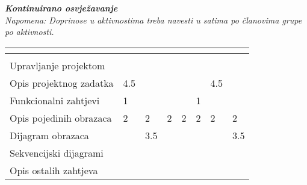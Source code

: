 			\textbf{\textit{Kontinuirano osvježavanje}}\\
			
			 \textit{Napomena: Doprinose u aktivnostima treba navesti u satima po članovima grupe po aktivnosti.}
					
						
			
			\begin{longtabu} to \textwidth {|X[7, l]|X[1, c]|X[1, c]|X[1, c]|X[1, c]|X[1, c]|X[1, c]|X[1, c]|}
								
				  &      &  &	 &	 &
				 &
				 &	 \\ \hline 
				\endfirsthead
				
			
				  &      &  &	 &
				 &	 &
				 &	 \\ \hline 
				\endhead
				
				
				\endfoot
							
				 
				\endlastfoot
				
				Upravljanje projektom 		&  &  &  &  &  &  & \\ \hline
				Opis projektnog zadatka 	& 4.5 &  &  &  &  & 4.5 & \\ \hline
				
				Funkcionalni zahtjevi       & 1 &  &  &  & 1 &  &  \\ \hline
				Opis pojedinih obrazaca 	& 2 & 2 & 2 & 2 & 2 & 2 & 2 \\ \hline
				Dijagram obrazaca 			&  & 3.5 &  &  &  & & 3.5  \\ \hline
				Sekvencijski dijagrami 		&  &  &  &  &  &  &  \\ \hline
				Opis ostalih zahtjeva 		&  &  &  &  &  &  &  \\ \hline


\end{longtabu}
